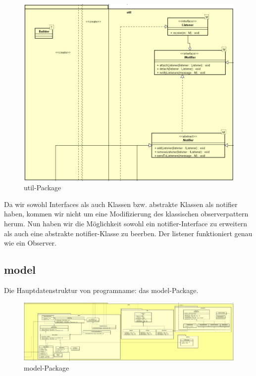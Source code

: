 \begin{figure}[H]
  \centering
  \includegraphics[width=\textwidth]{../diagramimages/util.png}
  \caption{util-Package}
\end{figure}

Da wir sowohl Interfaces als auch Klassen bzw. abstrakte Klassen als
\gls{notifier} haben, kommen wir nicht um eine Modifizierung des klassischen
\gls{observerpattern} herum. Nun haben wir die Möglichkeit sowohl ein
\gls{notifier}-Interface zu erweitern als auch eine abstrakte
\gls{notifier}-Klasse zu beerben. Der \gls{listener} funktioniert genau wie ein
Observer.


\subsection{model}


Die Hauptdatenstruktur von \gls{programname}: das model-Package.

\begin{figure}[H]
  \centering
  \includegraphics[width=\textwidth]{../diagramimages/model.png}
  \caption{model-Package}
\end{figure}

